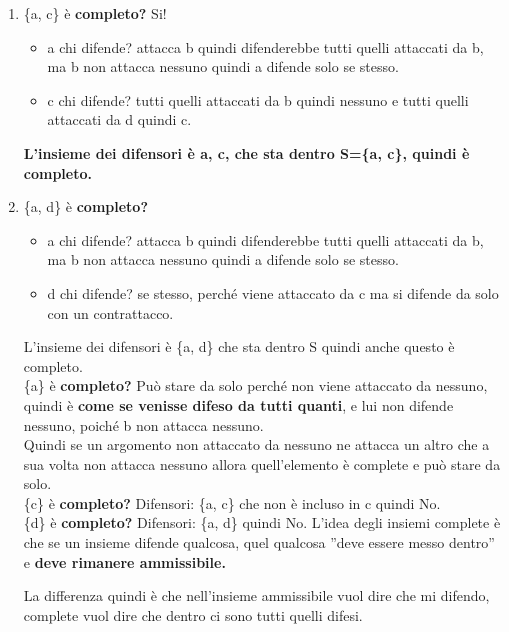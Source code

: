 \begin{enumerate}
    \item \{a, c\} è \textbf{completo?} Si!
          \begin{itemize}
              \item a chi difende? attacca b quindi difenderebbe tutti quelli
                    attaccati da b, ma b non attacca nessuno quindi a difende solo se
                    stesso.
              \item c chi difende? tutti quelli attaccati da b quindi nessuno e
                    tutti quelli attaccati da d quindi c.
          \end{itemize}
          \textbf{L'insieme dei difensori è a, c, che sta dentro S=\{a, c\},
              quindi è completo.}
    \item \{a, d\} è \textbf{completo?}
          \begin{itemize}
              \item a chi difende? attacca b quindi difenderebbe tutti quelli
                    attaccati da b, ma b non attacca nessuno quindi a difende solo se
                    stesso.
              \item d chi difende? se stesso, perché viene attaccato da c ma si
                    difende da solo con un contrattacco.
          \end{itemize}
          L'insieme dei difensori è \{a, d\} che sta dentro S quindi anche
          questo è completo. \\\{a\} è \textbf{completo?} Può stare da solo
          perché non viene attaccato da nessuno, quindi è \textbf{come se
              venisse difeso da tutti quanti}, e lui non difende nessuno, poiché b
          non attacca nessuno. \\Quindi se un argomento non attaccato da nessuno
          ne attacca un altro che a sua volta non attacca nessuno allora
          quell'elemento è complete e può stare da solo. \\\{c\} è
          \textbf{completo?} Difensori: \{a, c\} che non è incluso in c quindi
          No. \\\{d\} è \textbf{completo?} Difensori: \{a, d\} quindi No. L'idea
          degli insiemi complete è che se un insieme difende qualcosa, quel
          qualcosa ”deve essere messo dentro” e \textbf{deve rimanere
              ammissibile.}

          \vspace{0.8cm}

          La differenza quindi è che nell'insieme ammissibile vuol dire che mi
          difendo, complete vuol dire che dentro ci sono tutti quelli difesi.
\end{enumerate}
\
